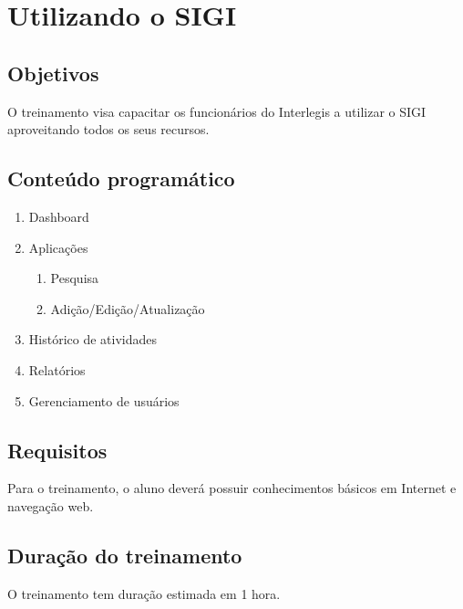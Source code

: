 %
%

\section{Utilizando o SIGI}
\label{sec:sigiuso}

\subsection{Objetivos}
O treinamento visa capacitar os funcionários do Interlegis a utilizar
o SIGI aproveitando todos os seus recursos.

\subsection{Conteúdo programático}
\begin{enumerate}
\item Dashboard
\item Aplicações
  \begin{enumerate}
  \item Pesquisa
  \item Adição/Edição/Atualização
  \end{enumerate}
\item Histórico de atividades
\item Relatórios
\item Gerenciamento de usuários
\end{enumerate}

\subsection{Requisitos}
Para o treinamento, o aluno deverá possuir conhecimentos básicos em
Internet e navegação web.

\subsection{Duração do treinamento}
O treinamento tem duração estimada em 1 hora.

%
%
